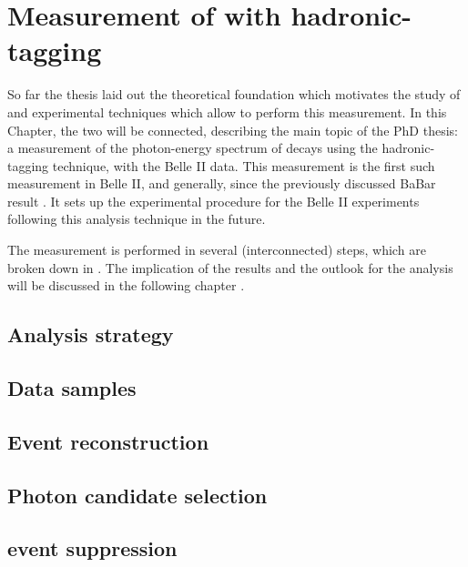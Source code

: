 \chapter{Measurement of \safeBtoXsgamma with hadronic-tagging}\label{ch:analysis}

So far the thesis laid out the theoretical foundation which motivates the study of \BtoXsgamma 
and experimental techniques which allow to perform this measurement.
In this Chapter, the two will be connected, describing the main topic of the PhD thesis: 
a measurement of the photon-energy spectrum of \BtoXsgamma decays using the hadronic-tagging technique,
with the Belle II data.
This measurement is the first such measurement in Belle II, and generally, since the previously discussed BaBar result \cite{BaBar:2007yhb}.
It sets up the experimental procedure for the Belle II experiments following this analysis technique in the future.

The measurement is performed in several (interconnected) steps, which are broken down in .
The implication of the results and the outlook for the analysis will be discussed in the following chapter .


\section{Analysis strategy}\label{sec:analysis_strategy}


\section{Data samples}\label{sec:data_samples}


\section{Event reconstruction}\label{sec:event_reconstruction}


\section{Photon candidate selection}\label{sec:photon_selection}


\section{\texorpdfstring{\MakeLowercase{\epem\ra\qqbar}}{e+e-->qqbar} event suppression}\label{sec:continuum_suppression}


